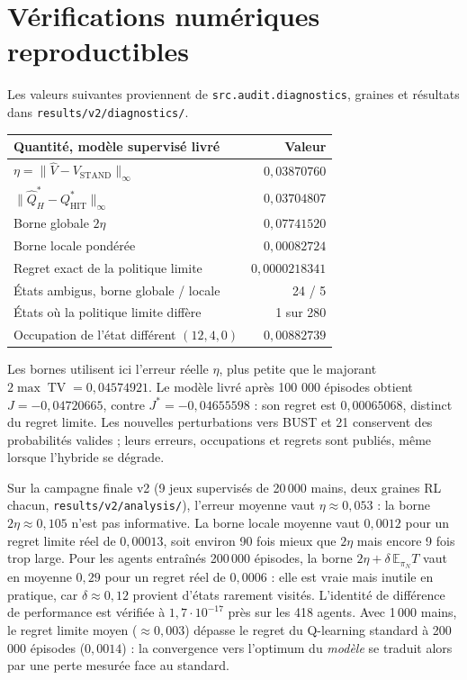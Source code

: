 \documentclass[11pt,a4paper]{article}
\theoremstyle{remark}\newtheorem*{remarque}{Remarque}
\newcommand{\E}{\mathbb E}
\newcommand{\1}{\mathbf 1}
\newcommand{\VS}{V_{\mathrm{STAND}}}
\newcommand{\QH}{Q^*_{\mathrm{HIT}}}
\newcommand{\TV}{\operatorname{TV}}
\begin{document}
\section{Vérifications numériques reproductibles}
Les valeurs suivantes proviennent de \texttt{src.audit.diagnostics}, graines et
résultats dans \texttt{results/v2/diagnostics/}.
\begin{center}
\begin{tabular}{lr}\toprule
Quantité, modèle supervisé livré & Valeur \\\midrule
$\eta=\|\widehat V-\VS\|_\infty$ & $0{,}03870760$\\
$\|\widehat Q^*_H-\QH\|_\infty$ & $0{,}03704807$\\
Borne globale $2\eta$ & $0{,}07741520$\\
Borne locale pondérée & $0{,}00082724$\\
Regret exact de la politique limite & $0{,}0000218341$\\
États ambigus, borne globale / locale & 24 / 5\\
États où la politique limite diffère & 1 sur 280\\
Occupation de l'état différent $(12,4,0)$ & $0{,}00882739$\\
\bottomrule\end{tabular}
\end{center}
Les bornes utilisent ici l'erreur réelle $\eta$, plus petite que le majorant
$2\max\TV=0{,}04574921$. Le modèle livré après 100 000 épisodes obtient
$J=-0{,}04720665$, contre $J^*=-0{,}04655598$ : son regret est
$0{,}00065068$, distinct du regret limite.
Les nouvelles perturbations vers BUST et 21 conservent des probabilités valides ;
leurs erreurs, occupations et regrets sont publiés, même lorsque l'hybride se dégrade.

Sur la campagne finale v2 (9 jeux supervisés de 20\,000 mains, deux graines RL chacun,
\texttt{results/v2/analysis/}), l'erreur moyenne vaut $\eta\approx0{,}053$ : la borne
$2\eta\approx0{,}105$ n'est pas informative. La borne locale moyenne vaut $0{,}0012$
pour un regret limite réel de $0{,}00013$, soit environ 90 fois mieux que $2\eta$ mais
encore 9 fois trop large. Pour les agents entraînés 200\,000 épisodes, la borne
$2\eta+\delta\,\E_{\pi_N}T$ vaut en moyenne $0{,}29$ pour un regret réel de $0{,}0006$ :
elle est vraie mais inutile en pratique, car $\delta\approx0{,}12$ provient d'états
rarement visités. L'identité de différence de performance est vérifiée à
$1{,}7\cdot10^{-17}$ près sur les 418 agents. Avec 1\,000 mains, le regret limite
moyen ($\approx0{,}003$) dépasse le regret du Q-learning standard à 200\,000 épisodes
($0{,}0014$) : la convergence vers l'optimum du \emph{modèle} se traduit alors par une
perte mesurée face au standard.
\end{document}
